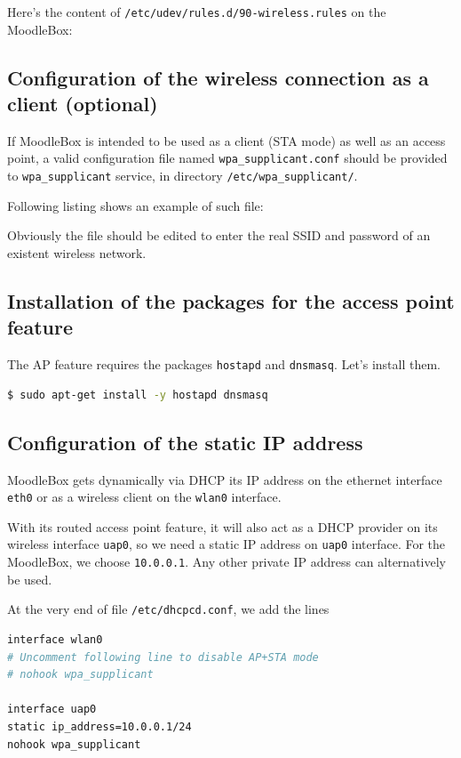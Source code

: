 \documentclass[12pt]{article}
\begin{document}
Here's the content of \lstinline{/etc/udev/rules.d/90-wireless.rules} on the MoodleBox:



\subsection{Configuration of the wireless connection as a client (optional)}

If MoodleBox is intended to be used as a client (STA mode) as well as an access point, a valid configuration file named \lstinline{wpa_supplicant.conf} should be provided to \lstinline{wpa_supplicant} service, in directory \lstinline{/etc/wpa_supplicant/}.

Following listing shows an example of such file:


Obviously the file should be edited to enter the real SSID and password of an existent wireless network.

\subsection{Installation of the packages for the access point feature}

The AP feature requires the packages \lstinline{hostapd} and \lstinline{dnsmasq}.
Let's install them.
\begin{lstlisting}[language=bash]
$ sudo apt-get install -y hostapd dnsmasq
\end{lstlisting}

\subsection{Configuration of the static IP address}\label{ssec-static-ip}

MoodleBox gets dynamically via DHCP its IP address on the ethernet interface \lstinline{eth0} or as a wireless client on the \lstinline{wlan0} interface.

With its routed access point feature, it will also act as a DHCP provider on its wireless interface \lstinline{uap0}, so we need a static IP address on \lstinline{uap0} interface. For the MoodleBox, we choose \lstinline{10.0.0.1}.
Any other private IP address can alternatively be used.

At the very end of file \lstinline{/etc/dhcpcd.conf}, we add the lines
\begin{lstlisting}[language=bash]
interface wlan0
# Uncomment following line to disable AP+STA mode
# nohook wpa_supplicant

interface uap0
static ip_address=10.0.0.1/24
nohook wpa_supplicant
\end{lstlisting}
\end{document}
